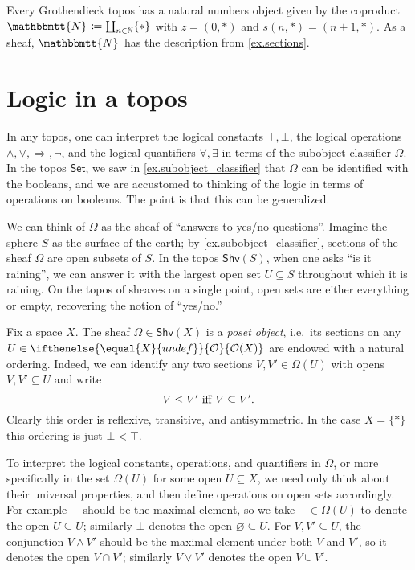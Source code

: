 \documentclass[reqno,11pt]{amsproc}
\theoremstyle{plain}
\theoremstyle{definition}
\newcommand{\cat}[1]{\mathsf{#1}}
\newcommand{\Set}{\cat{Set}}
\newcommand{\tn}[1]{\textnormal{#1}}
\newcommand{\internal}[1]{\raisebox{-.03ex}{$\mathbbmtt{#1}$}}
\newcommand{\nn}{\mathbb{N}}
\newcommand{\hs}{\hspace{1pt}}
\newcommand{\tnn}{\internal{N}\hs}
\newcommand{\shv}{\cat{Shv}}
\newcommand{\Op}[1][undef]{\ifthenelse{\equal{#1}{undef}}{\mathcal{O}}{\mathcal{O}(#1)}}
\newcommand{\imp}{\Rightarrow}
\numberwithin{equation}{section}
\begin{document}
Every Grothendieck topos has a natural numbers object given by the coproduct $\tnn\coloneqq\coprod_{n\in\nn}\{*\}$ with $z=(0,*)$ and $s(n,*)=(n+1,*)$. As a sheaf, $\tnn$ has the description from \cref{ex.sections}.


\section{Logic in a topos}\label{sec.logic}

In any topos, one can interpret the logical constants $\top,\bot$, the logical operations $\wedge,\lor,\imp,\neg$, and the logical quantifiers $\forall,\exists$ in terms of the subobject classifier $\Omega$. In the topos $\Set$, we saw in \cref{ex.subobject_classifier} that $\Omega$ can be identified with the booleans, and we are accustomed to thinking of the logic in terms of operations on booleans. The point is that this can be generalized.

We can think of $\Omega$ as the sheaf of ``answers to yes/no questions''. Imagine the sphere $S$ as the surface of the earth; by \cref{ex.subobject_classifier}, sections of the sheaf $\Omega$ are open subsets of $S$. In the topos $\shv(S)$, when one asks ``is it raining'', we can answer it with the largest open set $U\subseteq S$ throughout which it is raining. On the topos of sheaves on a single point, open sets are either everything or empty, recovering the notion of ``yes/no.''

Fix a space $X$. The sheaf $\Omega\in\shv(X)$ is a \emph{poset object}, i.e.\ its sections on any $U\in\Op[X]$ are endowed with a natural ordering. Indeed, we can identify any two sections $V,V'\in\Omega(U)$ with opens $V,V'\subseteq U$ and write
\begin{equation}\label{eqn.prop_order}
V\le V'\tn{ iff }V\subseteq V'.
\end{equation} 
Clearly this order is reflexive, transitive, and antisymmetric. In the case $X=\{*\}$ this ordering is just $\bot<\top$.

To interpret the logical constants, operations, and quantifiers in $\Omega$, or more specifically in the set $\Omega(U)$ for some open $U\subseteq X$, we need only think about their universal properties, and then define operations on open sets accordingly. For example $\top$ should be the maximal element, so we take $\top\in\Omega(U)$ to denote the open $U\subseteq U$; similarly $\bot$ denotes the open $\varnothing\subseteq U$. For $V,V'\subseteq U$, the conjunction $V\wedge V'$ should be the maximal element under both $V$ and $V'$, so it denotes the open $V\cap V'$; similarly $V\lor V'$ denotes the open $V\cup V'$.
\end{document}
